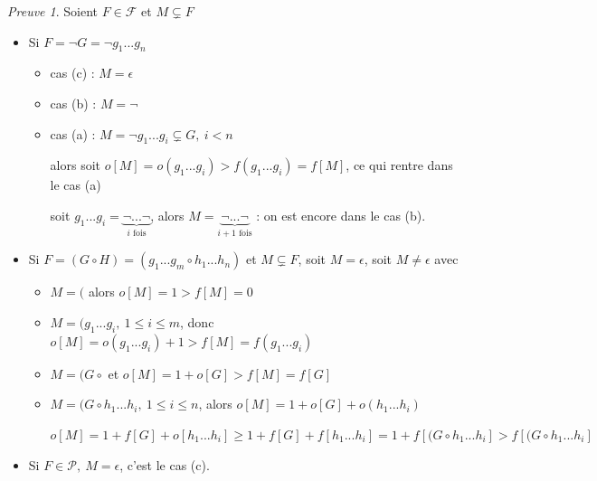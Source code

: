 \documentclass[]{article}
\theoremstyle{remark}
\newtheorem{myproof}{Preuve}
\theoremstyle{definition}
\begin{document}
\begin{myproof}
	Soient $F \in \mathcal{F}$ et $M \subsetneq F$
	
	\begin{itemize}
		\item Si $F=\neg G = \neg g_1 ... g_n$
		
		\begin{itemize}
			\item cas (c) : $M=\epsilon$
			\item cas (b) : $M=\neg$
			\item cas (a) : $M=\neg g_1 ... g_i \subsetneq G, ~ i < n$
			
			alors soit $o[M] = o(g_1...g_i) > f(g_1 ... g_i) = f[M]$, ce qui rentre dans le cas (a)
			
			soit $g_1...g_i = \underbrace{\neg ... \neg}_{i \text{ fois}}$, alors $M=\underbrace{\neg ... \neg}_{i + 1 \text{ fois}}$ : on est encore dans le cas (b).
		\end{itemize}
		
		\item Si $F=(G \circ H) = (g_1 ... g_m \circ h_1 ... h_n)$ et $M \subsetneq F$, soit $M=\epsilon$, soit $M \neq \epsilon$ avec
		
		\begin{itemize}
			\item $M=($ alors $o[M]=1 > f[M] = 0$
			\item $M=(g_1...g_i, ~ 1 \leqslant i \leqslant m$, donc $o[M]=o(g_1...g_i) + 1 > f[M] = f(g_1...g_i)$
			\item $M=(G \circ$ et $o[M]=1+o[G] > f[M]=f[G]$
			\item $M=(G \circ h_1 ... h_i, ~ 1 \leqslant i \leqslant n$, alors $o[M] = 1 + o[G] + o(h_1...h_i)$
			
			$o[M] = 1 + f[G] + o[h_1...h_i] \geqslant 1 + f[G] + f[h_1...h_i] = 1 + f[(G \circ h_1...h_i] > f[(G \circ h_1...h_i]$
		\end{itemize}
		
		\item Si $F \in \mathcal{P}, ~ M=\epsilon$, c'est le cas (c).
	\end{itemize}
\end{myproof}
\end{document}
